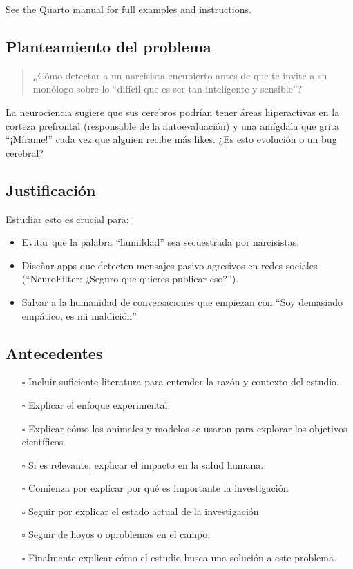 \documentclass[
]{article}
\providecommand{\tightlist}{%
  \setlength{\itemsep}{0pt}\setlength{\parskip}{0pt}}\usepackage{longtable,booktabs,array}
\begin{document}
See the Quarto manual for full examples and instructions.

\subsection{Planteamiento del
problema}\label{planteamiento-del-problema}

\begin{quote}
¿Cómo detectar a un narcisista encubierto antes de que te invite a su
monólogo sobre lo ``difícil que es ser tan inteligente y sensible''?
\end{quote}

La neurociencia sugiere que sus cerebros podrían tener áreas
hiperactivas en la corteza prefrontal (responsable de la autoevaluación)
y una amígdala que grita ``¡Mírame!'' cada vez que alguien recibe más
likes. ¿Es esto evolución o un bug cerebral?

\subsection{Justificación}\label{justificaciuxf3n}

Estudiar esto es crucial para:

\begin{itemize}
\item
  Evitar que la palabra ``humildad'' sea secuestrada por narcisistas.
\item
  Diseñar apps que detecten mensajes pasivo-agresivos en redes sociales
  (``NeuroFilter: ¿Seguro que quieres publicar eso?'').
\item
  Salvar a la humanidad de conversaciones que empiezan con ``Soy
  demasiado empático, es mi maldición''
\end{itemize}

\subsection{Antecedentes}\label{antecedentes}

\begin{itemize}
\tightlist
\item[$\square$]
  Incluir suficiente literatura para entender la razón y contexto del
  estudio.
\item[$\square$]
  Explicar el enfoque experimental.
\item[$\square$]
  Explicar cómo los animales y modelos se usaron para explorar los
  objetivos científicos.
\item[$\square$]
  Si es relevante, explicar el impacto en la salud humana.
\item[$\square$]
  Comienza por explicar por qué es importante la investigación
\item[$\square$]
  Seguir por explicar el estado actual de la investigación
\item[$\square$]
  Seguir de hoyos o oproblemas en el campo.
\item[$\square$]
  Finalmente explicar cómo el estudio busca una solución a este
  problema.
\end{itemize}
\end{document}
